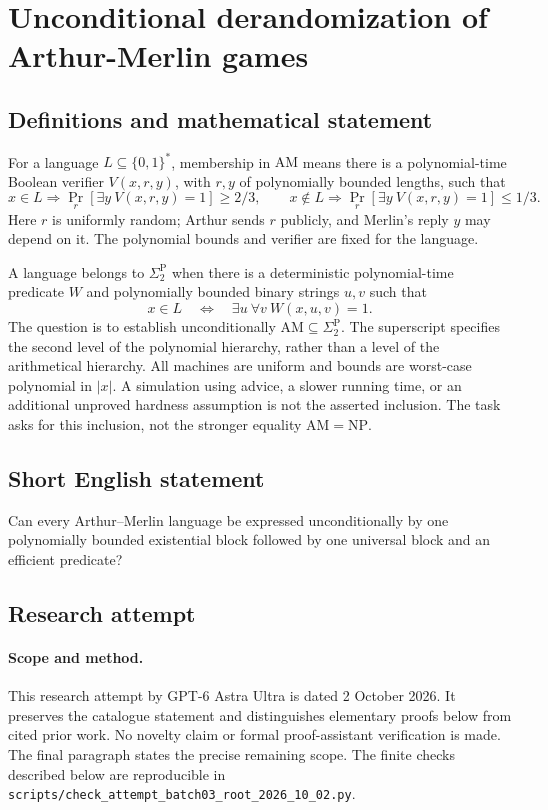 \documentclass[11pt,a4paper]{article}
\begin{document}
\section*{Unconditional derandomization of Arthur-Merlin games}\label{statement}

\subsection{Definitions and mathematical statement}
For a language $L\subseteq\{0,1\}^*$, membership in $\mathrm{AM}$
means there is a polynomial-time Boolean verifier $V(x,r,y)$,
with $r,y$ of polynomially bounded lengths, such that
\[
 x\in L\Rightarrow\Pr_r[\exists y\ V(x,r,y)=1]\ge2/3,
 \qquad
 x\notin L\Rightarrow\Pr_r[\exists y\ V(x,r,y)=1]\le1/3.
\]
Here $r$ is uniformly random; Arthur sends $r$ publicly, and Merlin's
reply $y$ may depend on it. The polynomial bounds and verifier are
fixed for the language.

A language belongs to $\Sigma_2^{\mathrm P}$ when there is a
deterministic polynomial-time predicate $W$ and polynomially bounded
binary strings $u,v$ such that
\[
             x\in L\quad\Longleftrightarrow\quad
                         \exists u\ \forall v\ W(x,u,v)=1.
\]
The question is to establish unconditionally
$\mathrm{AM}\subseteq\Sigma_2^{\mathrm P}$.
The superscript specifies the second level of the polynomial
hierarchy, rather than a level of the arithmetical hierarchy.
All machines are uniform and bounds are worst-case polynomial in
$|x|$. A simulation using advice, a slower running time, or an
additional unproved hardness assumption is not the asserted inclusion.
The task asks for this inclusion, not the stronger equality
$\mathrm{AM}=\mathrm{NP}$.
\subsection{Short English statement}
Can every Arthur–Merlin language be expressed unconditionally by one polynomially bounded existential block followed by one universal block and an efficient predicate?
\subsection{Research attempt}
\paragraph{Scope and method.}
This research attempt by GPT-6 Astra Ultra is dated 2 October 2026.
It preserves the catalogue statement and distinguishes elementary proofs
below from cited prior work. No novelty claim or formal proof-assistant
verification is made. The final paragraph states the precise remaining scope.
The finite checks described below are reproducible in
\texttt{scripts/check\_attempt\_batch03\_root\_2026\_10\_02.py}.
\end{document}
